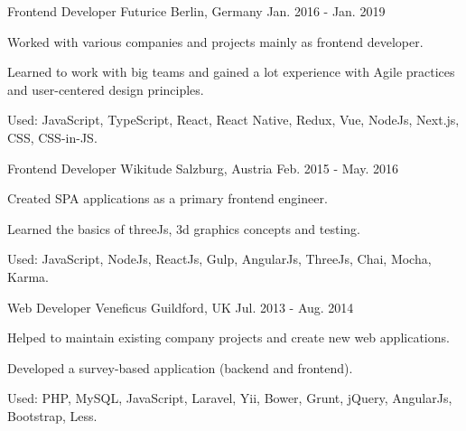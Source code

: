

\begin{cventries}

  \cventry
    {Frontend Developer} %
    {Futurice} %
    {Berlin, Germany} %
    {Jan. 2016 - Jan. 2019} %
    {
      \begin{cvitems} %
        \item {Worked with various companies and projects mainly as frontend developer.}
        \item {Learned to work with big teams and gained a lot experience with Agile practices and user-centered design principles.}
        \item {Used: JavaScript, TypeScript, React, React Native, Redux, Vue, NodeJs, Next.js, CSS, CSS-in-JS.}
      \end{cvitems}
    }

  \cventry
    {Frontend Developer} %
    {Wikitude} %
    {Salzburg, Austria} %
    {Feb. 2015 - May. 2016} %
    {
      \begin{cvitems} %
        \item {Created SPA applications as a primary frontend engineer.}
        \item {Learned the basics of threeJs, 3d graphics concepts and testing.}
        \item {Used: JavaScript, NodeJs, ReactJs, Gulp, AngularJs, ThreeJs, Chai, Mocha, Karma.}
      \end{cvitems}
    }

  \cventry
    {Web Developer} %
    {Veneficus} %
    {Guildford, UK} %
    {Jul. 2013 - Aug. 2014} %
    {
      \begin{cvitems} %
        \item {Helped to maintain existing company projects and create new web applications.}
        \item {Developed a survey-based application (backend and frontend).}
        \item {Used: PHP, MySQL, JavaScript, Laravel, Yii, Bower, Grunt, jQuery, AngularJs, Bootstrap, Less.}
      \end{cvitems}
    }

\end{cventries}

